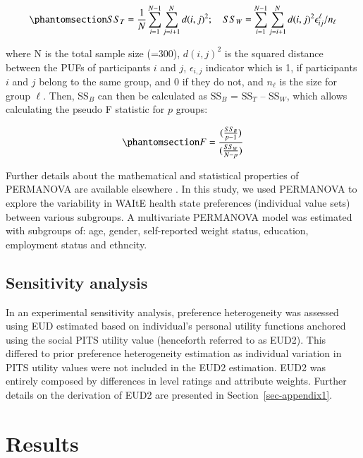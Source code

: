 \documentclass[
  number,
  preprint]{elsarticle}
\begin{document}
\begin{equation}\phantomsection\label{eq-sumsquares}{ 
    SS_{T} = \frac{1}{N}\sum_{i=1}^{N-1}\sum_{j=i+1}^{N}d(i,j)^{2}; \quad SS_{W} = \sum_{i=1}^{N-1}\sum_{j=i+1}^{N}d(i,j)^{2}\epsilon_{ij}^{\ell}/n_{\ell}
}\end{equation}

where N is the total sample size (=300), \(d(i,j)^2\) is the squared
distance between the PUFs of participants \(i\) and \(j\),
\(\epsilon_{i,j}\) indicator which is 1, if participants \(i\) and \(j\)
belong to the same group, and 0 if they do not, and \(n_{\ell}\) is the
size for group \(\ell\). Then, SS\(_B\) can then be calculated as
SS\(_B\) = SS\(_T\) -- SS\(_W\), which allows calculating the pseudo F
statistic for \(p\) groups:

\begin{equation}\phantomsection\label{eq-ssb}{
F= \frac{(\frac{SS_B}{p-1})}{(\frac{SS_W}{N-p})}
}\end{equation}

Further details about the mathematical and statistical properties of
PERMANOVA are available elsewhere
\citep{Schneider2024ExploringLevel, Anderson2017, Anderson2013PERMANOVATesting}.
In this study, we used PERMANOVA to explore the variability in WAItE
health state preferences (individual value sets) between various
subgroups. A multivariate PERMANOVA model was estimated with subgroups
of: age, gender, self-reported weight status, education, employment
status and ethncity.

\subsection{Sensitivity analysis}\label{sensitivity-analysis}

In an experimental sensitivity analysis, preference heterogeneity was
assessed using EUD estimated based on individual's personal utility
functions anchored using the social PITS utility value (henceforth
referred to as EUD2). This differed to prior preference heterogeneity
estimation as individual variation in PITS utility values were not
included in the EUD2 estimation. EUD2 was entirely composed by
differences in level ratings and attribute weights. Further details on
the derivation of EUD2 are presented in Section~\ref{sec-appendix1}.

\section{Results}\label{results}
\end{document}
